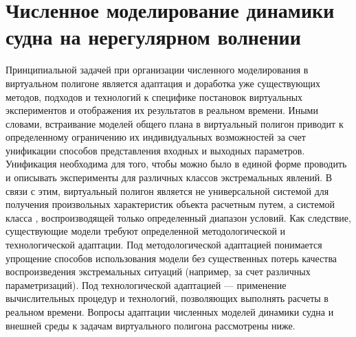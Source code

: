\chapter{Численное моделирование динамики судна на нерегулярном волнении}


Принципиальной задачей при организации численного моделирования в виртуальном полигоне является адаптация и доработка уже существующих методов, подходов и технологий к специфике постановок виртуальных экспериментов и отображения их результатов в реальном времени. Иными словами, встраивание моделей общего плана в виртуальный полигон приводит к определенному ограничению их индивидуальных возможностей за счет унификации способов представления входных и выходных параметров. Унификация необходима для того, чтобы можно было в единой форме проводить и описывать эксперименты для различных классов экстремальных явлений. В связи с этим, виртуальный полигон является не универсальной системой для получения произвольных характеристик объекта расчетным путем, а системой класса , воспроизводящей только определенный диапазон условий. Как следствие, существующие модели требуют определенной методологической и технологической адаптации. Под методологической адаптацией понимается упрощение способов использования модели без существенных потерь качества воспроизведения экстремальных ситуаций (например, за счет различных параметризаций). Под технологической адаптацией --- применение вычислительных процедур и технологий, позволяющих выполнять расчеты в реальном времени. Вопросы адаптации численных моделей динамики судна и внешней среды к задачам виртуального полигона рассмотрены ниже.